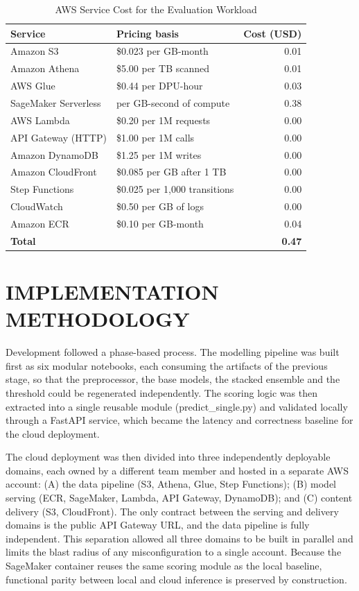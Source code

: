 \documentclass[conference]{IEEEtran}
\begin{document}
\begin{table}[htbp]
\caption{AWS Service Cost for the Evaluation Workload}
\begin{center}
\begin{tabular}{|l|l|r|}
\hline
\textbf{Service} & \textbf{Pricing basis} & \textbf{Cost (USD)} \\
\hline
Amazon S3 & \$0.023 per GB-month & 0.01 \\
Amazon Athena & \$5.00 per TB scanned & 0.01 \\
AWS Glue & \$0.44 per DPU-hour & 0.03 \\
SageMaker Serverless & per GB-second of compute & 0.38 \\
AWS Lambda & \$0.20 per 1M requests & 0.00 \\
API Gateway (HTTP) & \$1.00 per 1M calls & 0.00 \\
Amazon DynamoDB & \$1.25 per 1M writes & 0.00 \\
Amazon CloudFront & \$0.085 per GB after 1 TB & 0.00 \\
Step Functions & \$0.025 per 1,000 transitions & 0.00 \\
CloudWatch & \$0.50 per GB of logs & 0.00 \\
Amazon ECR & \$0.10 per GB-month & 0.04 \\
\hline
\textbf{Total} & & \textbf{0.47} \\
\hline
\end{tabular}
\label{tab:cost}
\end{center}
\end{table}

\section{IMPLEMENTATION METHODOLOGY}
Development followed a phase-based process. The modelling pipeline was built first as six modular notebooks, each consuming the artifacts of the previous stage, so that the preprocessor, the base models, the stacked ensemble and the threshold could be regenerated independently. The scoring logic was then extracted into a single reusable module (predict\_single.py) and validated locally through a FastAPI service, which became the latency and correctness baseline for the cloud deployment.

The cloud deployment was then divided into three independently deployable domains, each owned by a different team member and hosted in a separate AWS account: (A) the data pipeline (S3, Athena, Glue, Step Functions); (B) model serving (ECR, SageMaker, Lambda, API Gateway, DynamoDB); and (C) content delivery (S3, CloudFront). The only contract between the serving and delivery domains is the public API Gateway URL, and the data pipeline is fully independent. This separation allowed all three domains to be built in parallel and limits the blast radius of any misconfiguration to a single account. Because the SageMaker container reuses the same scoring module as the local baseline, functional parity between local and cloud inference is preserved by construction.
\end{document}
